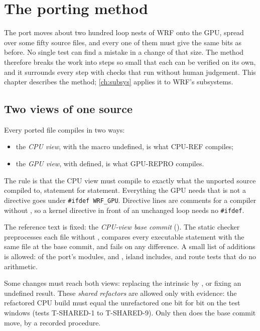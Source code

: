 \chapter{The porting method}\label{ch:port}

The port moves about two hundred loop nests of WRF onto the GPU, spread over some fifty source files, and every one
of them must give the same bits as before. No single test can find a mistake in a change of that size. The method
therefore breaks the work into steps so small that each can be verified on its own, and it surrounds every step with
checks that run without human judgement. This chapter describes the method; \cref{ch:subsys} applies it to WRF's
subsystems.

\section{Two views of one source}

Every ported file compiles in two ways:
\begin{itemize}
  \item the \emph{CPU view}, with the macro  undefined, is what CPU-REF compiles;
  \item the \emph{GPU view}, with  defined, is what GPU-REPRO compiles.
\end{itemize}
The rule is that the CPU view must compile to exactly what the unported source compiled to, statement for statement.
Everything the GPU needs that is not a directive goes under \texttt{\#ifdef WRF\_GPU}. Directive lines are comments for a
compiler without , so a kernel directive in front of an unchanged loop needs no \texttt{\#ifdef}.

The reference text is fixed: the \emph{CPU-view base commit} (). The static checker
 preprocesses each file without , compares every executable statement with the same
file at the base commit, and fails on any difference. A small list of additions is allowed:  of the port's
modules,  and , island includes, and route tests that do no arithmetic.

Some changes must reach both views: replacing the intrinsic  by , or fixing an undefined
result. These \emph{shared refactors} are allowed only with evidence: the refactored CPU build must equal the
unrefactored one bit for bit on the test windows (tests T-SHARED-1 to T-SHARED-9). Only then does the base commit move,
by a recorded procedure.

